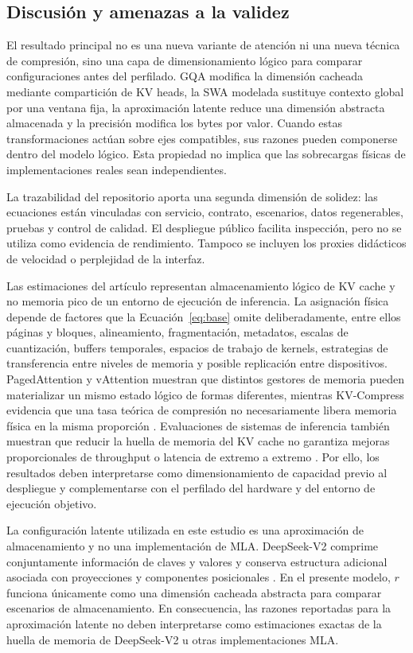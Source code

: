 \documentclass[a4paper,twocolumn]{article}
\begin{document}
\subsection{Discusión y amenazas a la validez}
El resultado principal no es una nueva variante de atención ni una nueva técnica de compresión, sino una capa de dimensionamiento lógico para comparar configuraciones antes del perfilado. GQA modifica la dimensión cacheada mediante compartición de KV heads, la SWA modelada sustituye contexto global por una ventana fija, la aproximación latente reduce una dimensión abstracta almacenada y la precisión modifica los bytes por valor. Cuando estas transformaciones actúan sobre ejes compatibles, sus razones pueden componerse dentro del modelo lógico. Esta propiedad no implica que las sobrecargas físicas de implementaciones reales sean independientes.

La trazabilidad del repositorio aporta una segunda dimensión de solidez: las ecuaciones están vinculadas con servicio, contrato, escenarios, datos regenerables, pruebas y control de calidad. El despliegue público facilita inspección, pero no se utiliza como evidencia de rendimiento. Tampoco se incluyen los proxies didácticos de velocidad o perplejidad de la interfaz.

Las estimaciones del artículo representan almacenamiento lógico de KV cache y no memoria pico de un entorno de ejecución de inferencia. La asignación física depende de factores que la Ecuación~\eqref{eq:base} omite deliberadamente, entre ellos páginas y bloques, alineamiento, fragmentación, metadatos, escalas de cuantización, buffers temporales, espacios de trabajo de kernels, estrategias de transferencia entre niveles de memoria y posible replicación entre dispositivos. PagedAttention y vAttention muestran que distintos gestores de memoria pueden materializar un mismo estado lógico de formas diferentes, mientras KV-Compress evidencia que una tasa teórica de compresión no necesariamente libera memoria física en la misma proporción \cite{kwon2023efficient,prabhu2025vattention,rehg2024kvcompress}. Evaluaciones de sistemas de inferencia también muestran que reducir la huella de memoria del KV cache no garantiza mejoras proporcionales de throughput o latencia de extremo a extremo \cite{gao2025rethinking}. Por ello, los resultados deben interpretarse como dimensionamiento de capacidad previo al despliegue y complementarse con el perfilado del hardware y del entorno de ejecución objetivo.

La configuración latente utilizada en este estudio es una aproximación de almacenamiento y no una implementación de MLA. DeepSeek-V2 comprime conjuntamente información de claves y valores y conserva estructura adicional asociada con proyecciones y componentes posicionales \cite{deepseek2024v2}. En el presente modelo, $r$ funciona únicamente como una dimensión cacheada abstracta para comparar escenarios de almacenamiento. En consecuencia, las razones reportadas para la aproximación latente no deben interpretarse como estimaciones exactas de la huella de memoria de DeepSeek-V2 u otras implementaciones MLA.
\end{document}
